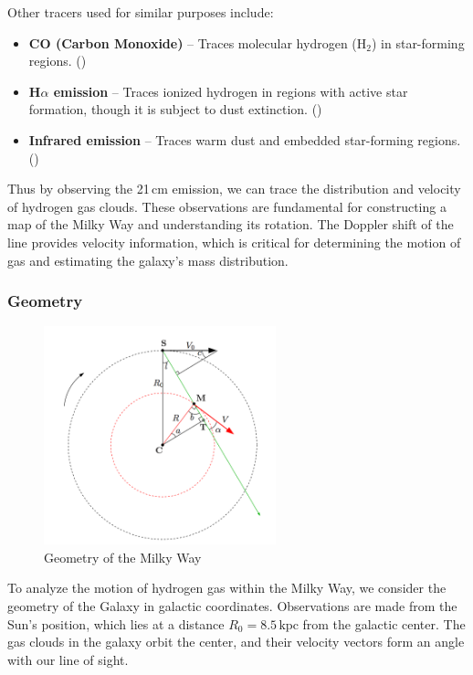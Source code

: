 \documentclass[12pt,a4paper]{article}
\begin{document}
Other tracers used for similar purposes include:
\begin{itemize}
    \item \textbf{CO (Carbon Monoxide)} – Traces molecular hydrogen (H$_2$) in star-forming regions. (\cite{bolatto2013co})
    \item \textbf{H$\alpha$ emission} – Traces ionized hydrogen in regions with active star formation, though it is subject to dust extinction. (\cite{kennicutt1998star})
    \item \textbf{Infrared emission} – Traces warm dust and embedded star-forming regions. (\cite{belfiore2023calibrating})
\end{itemize}
Thus by observing the 21\,cm emission, we can trace the distribution and velocity of hydrogen gas clouds. These observations are fundamental for constructing a map of the Milky Way and understanding its rotation. The Doppler shift of the line provides velocity information, which is critical for determining the motion of gas and estimating the galaxy’s mass distribution.



\subsubsection*{Geometry}

\begin{figure}[H]
  \centering
  \includegraphics[width=0.6\textwidth]{Pictures/geometry.png}
  \caption{Geometry of the Milky Way}
  \label{fig:geometry}
\end{figure}

To analyze the motion of hydrogen gas within the Milky Way, we consider the geometry of the Galaxy in galactic coordinates. Observations are made from the Sun's position, which lies at a distance $R_0 = 8.5\,\mathrm{kpc}$ from the galactic center. The gas clouds in the galaxy orbit the center, and their velocity vectors form an angle with our line of sight. 
\end{document}
